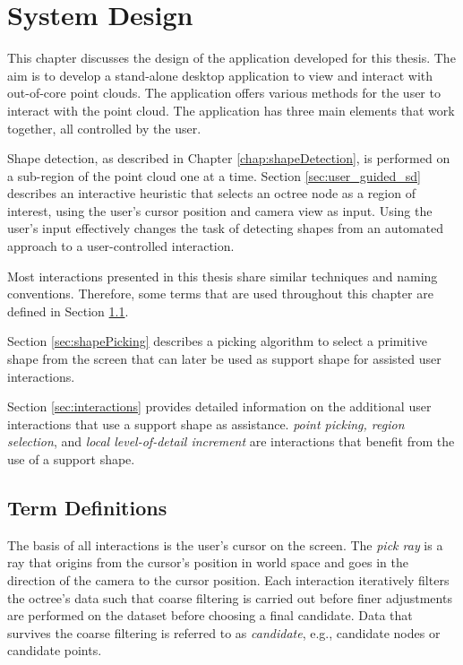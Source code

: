\chapter{System Design}
\label{chap:systemDesign}

This chapter discusses the design of the application developed for this thesis. The aim is to develop a stand-alone desktop application to view and interact with out-of-core point clouds. The application offers various methods for the user to interact with the point cloud. The application has three main elements that work together, all controlled by the user. 

\par

Shape detection, as described in Chapter \ref{chap:shapeDetection}, is performed on a sub-region of the point cloud one at a time. Section \ref{sec:user_guided_sd} describes an interactive heuristic that selects an octree node as a region of interest, using the user's cursor position and camera view as input. Using the user's input effectively changes the task of detecting shapes from an automated approach to a user-controlled interaction.

\par

Most interactions presented in this thesis share similar techniques and naming conventions. Therefore, some terms that are used throughout this chapter are defined in Section \ref{sec:termDefinitions}. 

\par

Section \ref{sec:shapePicking} describes a picking algorithm to select a primitive shape from the screen that can later be used as support shape for assisted user interactions. 

\par

Section \ref{sec:interactions} provides detailed information on the additional user interactions that use a support shape as assistance. \textit{point picking, region selection}, and \textit{local level-of-detail increment} are interactions that benefit from the use of a support shape. 


\section{Term Definitions}
\label{sec:termDefinitions}

The basis of all interactions is the user's cursor on the screen. The \textit{pick ray} is a ray that origins from the cursor’s position in world space and goes in the direction of the camera to the cursor position. 
Each interaction iteratively filters the octree's data such that coarse filtering is carried out before finer adjustments are performed on the dataset before choosing a final candidate. Data that survives the coarse filtering is referred to as \textit{candidate}, e.g., candidate nodes or candidate points. 


